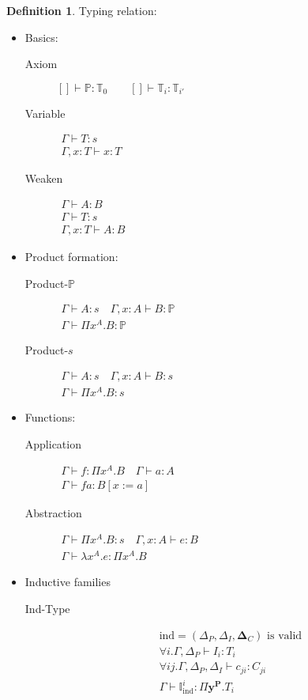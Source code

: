 \documentclass[12pt]{article}
\def\ind{\text{Ind}}
\def\Pbold{\mathbf{P}}
\def\ybold{\mathbf{y}}
\def\Deltabold{\mathbf{\Delta}}
\def\Prop{\mathbb{P}}
\def\Type{\mathbb{T}}
\def\ind{\text{ind}}
\newcommand{\Induct}[2]{\mathbb{I}^#1_#2}
\newcommand{\ruleh}[2]{\begin{array}{c} #1 \\ \hline #2\end{array}}
\newcommand{\rulev}[2]{\begin{array}{l} #1 \\ \hline #2\end{array}}
\theoremstyle{definition} \newtheorem{definition}{Definition}[section]
\theoremstyle{definition} \newtheorem{theorem}[definition]{Theorem}
\theoremstyle{definition} \newtheorem{lemma}[definition]{Lemma}
\begin{document}
\begin{definition}
  Typing relation:

  \begin{itemize}
  \item Basics:
    \begin{description}

    \item[Axiom] $[]\vdash \Prop:\Type_0 \quad\quad
      []\vdash \Type_i: \Type_{i'}$

    \item[Variable]
      $\ruleh{\Gamma\vdash T: s}{\Gamma,x:T\vdash x:T}$

    \item[Weaken]
      $\ruleh{
        \Gamma\vdash A:B \\
        \Gamma\vdash T: s}
      {\Gamma,x:T\vdash A:B}$

    \end{description}
  \item Product formation:
    \begin{description}
    \item[Product-$\Prop$]
      $\ruleh
      {\Gamma\vdash A:s \quad \Gamma,x:A\vdash B:\Prop}
      {\Gamma\vdash \Pi x^A.B : \Prop}$

    \item[Product-$s$]
      $\ruleh
      {\Gamma\vdash A:s \quad \Gamma,x:A\vdash B:s}
      {\Gamma\vdash \Pi x^A.B : s}$

    \end{description}

  \item Functions:
    \begin{description}
    \item[Application]
      $\ruleh
      {\Gamma\vdash f: \Pi x^A.B \quad \Gamma\vdash a : A}
      {\Gamma\vdash f a: B[x:=a]}$

    \item[Abstraction]
      $\ruleh
      {\Gamma\vdash \Pi x^A.B : s \quad \Gamma,x:A\vdash e: B}
      {\Gamma\vdash \lambda x^A.e : \Pi x^A.B}$
    \end{description}

  \item Inductive families
    \begin{description}
    \item[Ind-Type]
      $$\rulev
      {\ind = (\Delta_P, \Delta_I, \Deltabold_C) \text{ is valid}
        \\
        \forall i. \Gamma,\Delta_P\vdash I_i : T_i
        \\
        \forall ij. \Gamma,\Delta_P,\Delta_I \vdash c_{ji}:C_{ji}
      }
      {\Gamma\vdash \Induct{i}{\ind}
        : \Pi \ybold^\Pbold . T_i}$$


\end{description}
\end{itemize}
\end{definition}
\end{document}
